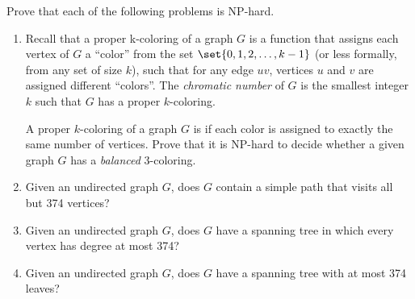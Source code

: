 \documentclass[11pt]{article}
\begin{document}

\noindent
Prove that each of the following problems is {NP}-hard.


\begin{enumerate}\itemsep3ex\parindent1.5em

\item Recall that a proper k-coloring of a graph $G$ is a function that assigns each vertex of $G$ a “color” from the set $\set{0,1,2,\dots,k-1}$ (or less formally, from any set of size $k$), such that for any edge $uv$, vertices $u$ and $v$ are assigned different “colors”.  The \emph{chromatic number} of $G$ is the smallest integer $k$ such that $G$ has a proper $k$-coloring.

A proper $k$-coloring of a graph $G$ is  if each color is
assigned to exactly the same number of vertices.  Prove that it is NP-hard to
decide whether a given graph $G$ has a \emph{balanced} 3-coloring.  

\item
Given an undirected graph $G$, does $G$ contain a simple path that visits all but 374 vertices?

\item
Given an undirected graph $G$, does $G$ have a spanning tree in which every vertex has degree at most 374?

\item
Given an undirected graph $G$, does $G$ have a spanning tree with at most 374 leaves?
\end{enumerate}
%
\end{document}
